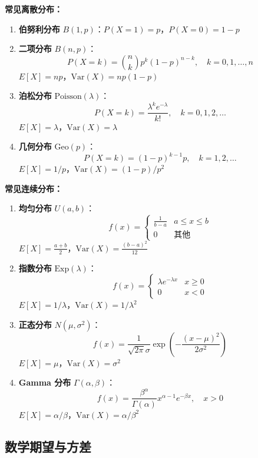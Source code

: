 \documentclass[12pt]{article}
\begin{document}
\textbf{常见离散分布：}

\begin{enumerate}
\item \textbf{伯努利分布} $B(1, p)$：$P(X = 1) = p$，$P(X = 0) = 1 - p$

\item \textbf{二项分布} $B(n, p)$：
$$P(X = k) = \binom{n}{k} p^k (1-p)^{n-k}, \quad k = 0, 1, \ldots, n$$
$E[X] = np$，$\text{Var}(X) = np(1-p)$

\item \textbf{泊松分布} $\text{Poisson}(\lambda)$：
$$P(X = k) = \frac{\lambda^k e^{-\lambda}}{k!}, \quad k = 0, 1, 2, \ldots$$
$E[X] = \lambda$，$\text{Var}(X) = \lambda$

\item \textbf{几何分布} $\text{Geo}(p)$：
$$P(X = k) = (1-p)^{k-1} p, \quad k = 1, 2, \ldots$$
$E[X] = 1/p$，$\text{Var}(X) = (1-p)/p^2$
\end{enumerate}

\textbf{常见连续分布：}

\begin{enumerate}
\item \textbf{均匀分布} $U(a, b)$：
$$f(x) = \begin{cases} \frac{1}{b-a} & a \leq x \leq b \\ 0 & \text{其他} \end{cases}$$
$E[X] = \frac{a+b}{2}$，$\text{Var}(X) = \frac{(b-a)^2}{12}$

\item \textbf{指数分布} $\text{Exp}(\lambda)$：
$$f(x) = \begin{cases} \lambda e^{-\lambda x} & x \geq 0 \\ 0 & x < 0 \end{cases}$$
$E[X] = 1/\lambda$，$\text{Var}(X) = 1/\lambda^2$

\item \textbf{正态分布} $N(\mu, \sigma^2)$：
$$f(x) = \frac{1}{\sqrt{2\pi}\sigma} \exp\left(-\frac{(x-\mu)^2}{2\sigma^2}\right)$$
$E[X] = \mu$，$\text{Var}(X) = \sigma^2$

\item \textbf{Gamma 分布} $\Gamma(\alpha, \beta)$：
$$f(x) = \frac{\beta^\alpha}{\Gamma(\alpha)} x^{\alpha-1} e^{-\beta x}, \quad x > 0$$
$E[X] = \alpha/\beta$，$\text{Var}(X) = \alpha/\beta^2$
\end{enumerate}

\subsection{数学期望与方差}
\end{document}
